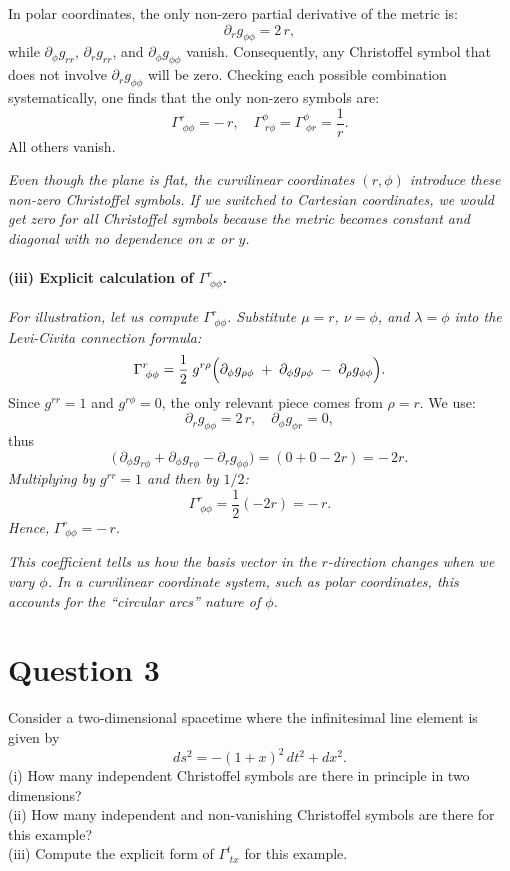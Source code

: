 \documentclass{article}
\begin{document}
In polar coordinates, the only non-zero partial derivative of the metric is:
\[
\partial_r g_{\phi\phi} = 2\,r,
\]
while \(\partial_\phi g_{rr}\), \(\partial_r g_{rr}\), and \(\partial_\phi g_{\phi\phi}\) vanish. Consequently, any Christoffel symbol that does not involve \(\partial_r g_{\phi\phi}\) will be zero. Checking each possible combination systematically, one finds that the only non-zero symbols are:
\[
\Gamma^r_{\;\phi\phi} = -\,r,
\quad
\Gamma^\phi_{\;r\phi} = \Gamma^\phi_{\;\phi r} = \frac{1}{r}.
\]
All others vanish.

\emph{Even though the plane is flat, the curvilinear coordinates \((r,\phi)\) introduce these non-zero Christoffel symbols. If we switched to Cartesian coordinates, we would get zero for all Christoffel symbols because the metric becomes constant and diagonal with no dependence on \(x\) or \(y\).}

\paragraph{(iii) Explicit calculation of \(\Gamma^r_{\;\phi\phi}\).}

\emph{For illustration, let us compute \(\Gamma^r_{\;\phi\phi}\). Substitute \(\mu = r\), \(\nu = \phi\), and \(\lambda = \phi\) into the Levi-Civita connection formula:}
\[
\Gamma^r_{\;\phi\phi}
=
\frac{1}{2}
\;g^{r\rho}
\Bigl(
\partial_\phi g_{\rho\phi}
\;+\;
\partial_\phi g_{\rho\phi}
\;-\;
\partial_\rho g_{\phi\phi}
\Bigr).
\]
Since \(g^{rr} = 1\) and \(g^{r\phi} = 0\), the only relevant piece comes from \(\rho = r\). We use:
\[
\partial_r g_{\phi\phi} = 2\,r,
\quad
\partial_\phi g_{\phi r} = 0,
\]
thus
\[
\bigl(\,\partial_\phi g_{r\phi} + \partial_\phi g_{r\phi} - \partial_r g_{\phi\phi}\bigr)
=
(0 + 0 - 2r)
=
-\,2r.
\]
\emph{Multiplying by \(g^{rr} = 1\) and then by \(1/2\):}
\[
\Gamma^r_{\;\phi\phi}
=
\frac12 (-2r)
=
-\,r.
\]
\emph{Hence,}
\(\boxed{\Gamma^r_{\;\phi\phi} = -\,r}.\)

\emph{This coefficient tells us how the basis vector in the \(r\)-direction changes when we vary \(\phi\). In a curvilinear coordinate system, such as polar coordinates, this accounts for the “circular arcs” nature of \(\phi\).}

\pagebreak

\section*{Question 3}

Consider a two-dimensional spacetime where the infinitesimal line element is given by
\[
ds^2 = -(1+x)^2 \, dt^2 + dx^2.
\]
(i) How many independent Christoffel symbols are there in principle in two dimensions?\\
(ii) How many independent and non-vanishing Christoffel symbols are there for this example?\\
(iii) Compute the explicit form of \(\Gamma^{t}_{\;tx}\) for this example.
\end{document}
